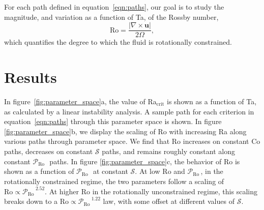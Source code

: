 \documentclass[twocolumn, amsmath, amsfonts, amssymb]{aastex62}
\newcommand{\grad}{\ensuremath{\nabla}}
\newcommand{\pro}{\ensuremath{\mathcal{P}_{\text{Ro}}\,}}
\begin{document}
For each path defined in equation~\ref{eqn:paths}, 
our goal is to study the magnitude, and variation as
a function of Ta, of the Rossby number,
\begin{equation}
    \text{Ro} = \frac{|\grad\times \bm{u}|}{2 \Omega},
    \label{eqn:ro}
\end{equation}
which quantifies the degree to which the fluid is rotationally constrained.


\section{Results}
\label{sec:results}
In figure~\ref{fig:parameter_space}a, the value of Ra$_{\text{crit}}$
is shown as a function of Ta, as
calculated by a linear instability analysis. A sample path for
each criterion in equation~\ref{eqn:paths} through
this parameter space is shown.
In figure \ref{fig:parameter_space}b, we display the scaling of Ro
with increasing Ra along various paths through parameter space.
We find that Ro increases on constant Co paths, decreases on constant $\mathcal{S}$
paths, and remains roughly constant along constant \pro$\,$ paths.
In figure \ref{fig:parameter_space}c, the behavior of Ro is shown as
a function of \pro$\,$ at constant $\mathcal{S}$.
At low Ro and \pro, in the rotationally constrained regime, the two parameters
follow a scaling of $\text{Ro}\propto\pro^{2.52}$.
At higher Ro in the rotationally unconstrained regime, this scaling breaks down
to a $\text{Ro}\propto\pro^{1.22}$ law, with some offset at different values of $\mathcal{S}$.
\end{document}
